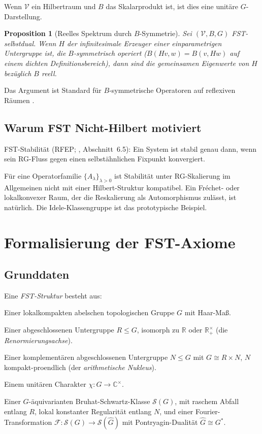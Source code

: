 \documentclass[11pt,a4paper]{article}
\theoremstyle{plain}
\newtheorem{proposition}[theorem]{Proposition}
\theoremstyle{definition}
\newcommand{\C}{\mathbb{C}}
\newcommand{\R}{\mathbb{R}}
\newcommand{\V}{\mathcal{V}}
\renewcommand{\S}{\mathcal{S}}
\newcommand{\chifn}{\chi}
\begin{document}
Wenn $\V$ ein Hilbertraum und $B$ das Skalarprodukt ist, ist dies eine unitäre
$G$-Darstellung.

\begin{proposition}[Reelles Spektrum durch $B$-Symmetrie]
\label{prop:real-spectrum}
Sei $(\V, B, G)$ FST-selbstdual. Wenn $H$ der infinitesimale
Erzeuger einer einparametrigen Untergruppe ist, die $B$-symmetrisch operiert
($B(Hv, w) = B(v, Hw)$ auf einem dichten Definitionsbereich), dann sind die gemeinsamen
Eigenwerte von $H$ bezüglich $B$ reell.
\end{proposition}

Das Argument ist Standard für $B$-symmetrische Operatoren auf reflexiven
Räumen \cite{Meyer2005}.

\subsection{Warum FST Nicht-Hilbert motiviert}

FST-Stabilität (RFEP; \cite{MathMaster}, Abschnitt~6.5): Ein System ist stabil genau dann, wenn sein RG-Fluss
gegen einen selbstähnlichen Fixpunkt konvergiert.

Für eine Operatorfamilie $\{A_\lambda\}_{\lambda > 0}$ ist Stabilität
unter RG-Skalierung im Allgemeinen nicht mit einer Hilbert-Struktur kompatibel.
Ein Fr\'echet- oder lokalkonvexer Raum, der die Reskalierung als
Automorphismus zulässt, ist natürlich. Die Idele-Klassengruppe ist
das prototypische Beispiel.

\section{Formalisierung der FST-Axiome}
\label{sec:axioms}

\subsection{Grunddaten}

Eine \emph{FST-Struktur} besteht aus:

\begin{description}[style=nextline]
\item[(G)] Einer lokalkompakten abelschen topologischen Gruppe $G$ mit Haar-Maß.
\item[(R)] Einer abgeschlossenen Untergruppe $R \leq G$, isomorph zu $\R$ oder
  $\R_+^\times$ (die \emph{Renormierungsachse}).
\item[(N)] Einer komplementären abgeschlossenen Untergruppe $N \leq G$ mit $G
  \cong R \times N$, $N$ kompakt-proendlich (der \emph{arithmetische Nukleus}).
\item[($\chifn$)] Einem unitären Charakter $\chifn : G \to \C^\times$.
\item[(S)] Einer $G$-äquivarianten Bruhat-Schwartz-Klasse $\S(G)$, mit
  raschem Abfall entlang $R$, lokal konstanter Regularität entlang $N$,
  und einer Fourier-Transformation $\mathcal F : \S(G) \to \S(\hat G)$
  mit Pontryagin-Dualität $\hat G \cong G^\ast$.
\end{description}
\end{document}
